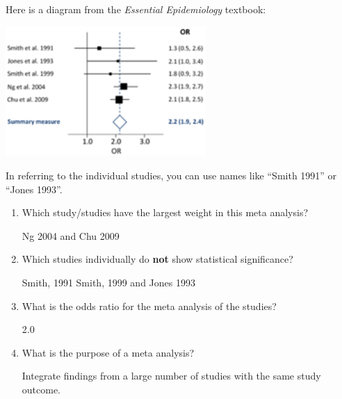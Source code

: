
Here is a diagram from the {\em Essential Epidemiology} textbook:

\centerline{\includegraphics[width=3in]{metastudy.png}}

In referring to the individual studies, you can use names like ``Smith 1991'' or ``Jones 1993''.

\begin{enumerate}

\item Which study/studies have the largest weight in this meta analysis?

\begin{AnswerText} 
Ng 2004 and Chu 2009
\end{AnswerText}

\item Which studies individually do {\bf not} show statistical significance?

\begin{AnswerText} 
Smith, 1991  Smith, 1999 and Jones 1993
\end{AnswerText}

\item What is the odds ratio for the meta analysis of the studies?

\begin{AnswerText} 
2.0
\end{AnswerText}

\item What is the purpose of a meta analysis?

\begin{AnswerText} 
Integrate findings from a large number of studies with the same study outcome.
\end{AnswerText}

\end{enumerate}
